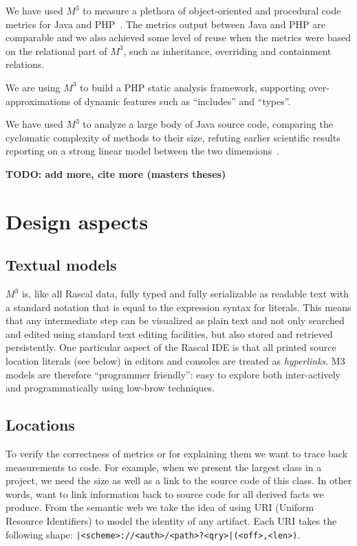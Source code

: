 \documentclass[conference]{IEEEtran}
\newcommand{\loc}[1]{\small{\texttt{#1}}\xspace}
\newcommand{\mthree}{\ensuremath{M^3}\xspace}
\begin{document}
We have used \mthree to measure a plethora of object-oriented and procedural code metrics for Java and PHP~\cite{mood,ck}. The metrics output between Java and PHP are comparable and we also achieved some level of reuse when the metrics were based on the relational part of \mthree, such as inheritance, overriding and containment relations.

We are using \mthree to build a PHP static analysis framework, supporting over-approximations of dynamic features such as ``includes'' and ``types''. 

We have used \mthree to analyze a large body of Java source code, comparing the cyclomatic complexity of methods to their size, refuting earlier scientific results reporting on a strong linear model between the two dimensions~\cite{davy}.

\textbf{TODO: add more, cite more (masters theses)}

\section{Design aspects}

\subsection{Textual models}

\mthree is, like all Rascal data, fully typed and fully serializable as readable
text with a standard notation that is equal to the expression syntax for
literals. This means that any intermediate step can be visualized as plain
text and not only searched and edited using standard text editing facilities,
but also stored and retrieved persistently. One particular aspect of the
Rascal IDE is that all printed source location literals (see below) in editors
and consoles are treated as \emph{hyperlinks}. M3 models are therefore
``programmer friendly'': easy to explore both inter-actively and
programmatically using low-brow techniques.

\subsection{Locations} 

To verify the correctness of metrics or for explaining them we want to trace
back measurements to code. For example, when we present the largest class in a
project, we need the size as well as a link to the source code of this class.
In other words, want to link information back to source code for all derived
facts we produce. From the semantic web we take the idea of using URI (Uniform
Resource Identifiers) to model the identity of any artifact. Each URI takes
the following shape: \loc{|<scheme>://<auth>/<path>?<qry>|(<off>,<len>)}.
\end{document}
